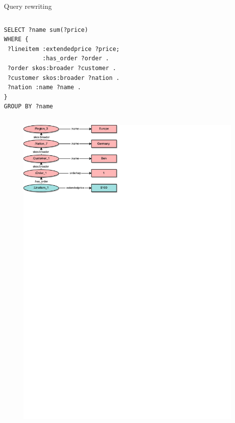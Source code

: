 \begin{frame}[fragile]{Query rewriting}
\begin{columns}
\begin{lstlisting}[style=rdf, captionpos=b,label=lst:snow, basicstyle=\scriptsize]
SELECT ?name sum(?price)
WHERE {
 ?lineitem :extendedprice ?price;
           :has_order ?order .
 ?order skos:broader ?customer .
 ?customer skos:broader ?nation .
 ?nation :name ?name .
}
GROUP BY ?name
\end{lstlisting}
\end{columns}

\begin{columns}
\centering
\begin{figure}
    \includegraphics[trim=0 648 280 0,clip,width=1\textwidth]{images/snowflakepattern-0.pdf}
\end{figure}
\end{columns}
\end{frame}



